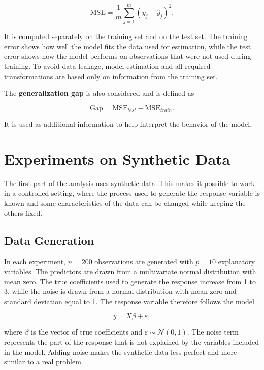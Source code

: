 \documentclass[11pt,a4paper]{article}
\begin{document}
\begin{equation}
    \mathrm{MSE} = \frac{1}{m}\sum_{j=1}^{m}(y_j-\hat{y}_j)^2.
\end{equation}

It is computed separately on the training set and on the test set. The training error shows how well the model fits the data used for estimation, while the test error shows how the model performs on observations that were not used during training. To avoid data leakage, model estimation and all required transformations are based only on information from the training set.

The \textbf{generalization gap} is also considered and is defined as

\begin{equation}
    \mathrm{Gap} = \mathrm{MSE}_{test} - \mathrm{MSE}_{train}.
\end{equation}

It is used as additional information to help interpret the behavior of the model.

\section{Experiments on Synthetic Data}

The first part of the analysis uses synthetic data. This makes it possible to work in a controlled setting, where the process used to generate the response variable is known and some characteristics of the data can be changed while keeping the others fixed.

\subsection{Data Generation}

In each experiment, $n=200$ observations are generated with $p=10$ explanatory variables. The predictors are drawn from a multivariate normal distribution with mean zero. The true coefficients used to generate the response increase from 1 to 3, while the noise is drawn from a normal distribution with mean zero and standard deviation equal to 1. The response variable therefore follows the model

\begin{equation}
    y = X\beta + \varepsilon,
\end{equation}

where $\beta$ is the vector of true coefficients and $\varepsilon \sim \mathcal{N}(0,1)$. The noise term represents the part of the response that is not explained by the variables included in the model. Adding noise makes the synthetic data less perfect and more similar to a real problem.
\end{document}
